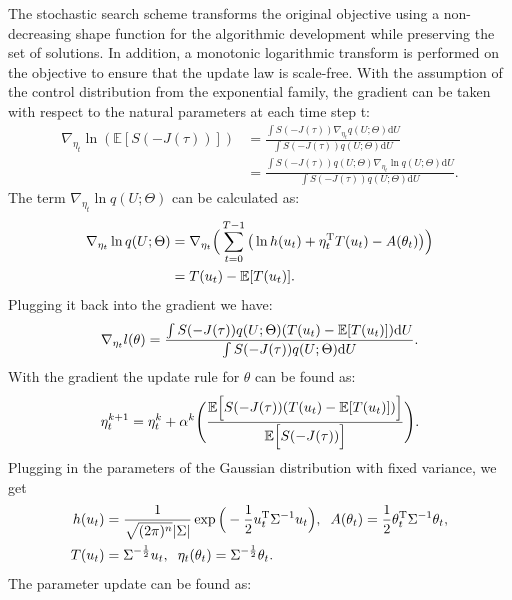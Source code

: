 \documentclass[twoside,11pt]{article}
\begin{document}
The stochastic search scheme transforms the original objective using a non-decreasing shape function for the algorithmic development while preserving the set of solutions. In addition, a monotonic logarithmic transform is performed on the objective to ensure that the update law is scale-free. With the assumption of the control distribution from the exponential family, the gradient can be taken with respect to the natural parameters at each time step t:
\begin{equation}
\begin{split}
\nabla_{\eta_t}  \ln\left(\mathbb{E}\left[S\left(- J(\tau)\right)\right]\right) &= \frac{\int S(-J(\tau))\nabla_{\eta_t} q(U;\Theta)\mathrm{d}U}{\int S(-J(\tau))q(U;\Theta)\mathrm{d}U} \\
&= \frac{\int S(-J(\tau))q(U;\Theta) \nabla_{\eta_t} \ln q(U;\Theta)\mathrm{d}U}{\int S(-J(\tau))q(U;\Theta)\mathrm{d}U}.
\end{split}
\end{equation}
The term $\nabla_{\eta_t} \ln q(U;\Theta)$ can be calculated as:
\begin{equation}
\begin{split}
\nabla_{\eta_t} \ln q(U;\Theta) &= \nabla_{\eta_t} \Big(\sum_{t=0}^{T-1}\big(\ln h(u_t) + \eta_t^\mathrm{T}T(u_t)-A(\theta_t) \big)\Big) \\
&= T(u_t) - \mathbb{E}[T(u_t)].
\end{split}
\end{equation}
Plugging it back into the gradient we have:
\begin{equation}
\nabla_{\eta_t} l(\theta) = \frac{\int S(-J(\tau))q(U;\Theta) (T(u_t) - \mathbb{E}[T(u_t)]) \mathrm{d}U}{\int S(-J(\tau))q(U;\Theta)\mathrm{d}U}\label{eq:gradient}.
\end{equation}
With the gradient the update rule for $\theta$ can be found as:
\begin{equation} \label{eq: ss_update}
\eta_t^{k+1} 
= \eta_t^k + \alpha^k\Bigg(\frac{\mathbb{E}\Big[S(-J(\tau)) (T(u_t) - \mathbb{E}[T(u_t)]) \Big]}{\mathbb{E} \Big[S(-J(\tau))\Big]}\Bigg).
\end{equation}
Plugging in the parameters of the Gaussian distribution with fixed variance, we get
\begin{equation}
\begin{split}
h(u_t) &= \frac{1}{\sqrt{(2\pi)^n}|\Sigma|}\exp\Big(-\frac{1}{2}u_t^\mathrm{T}\Sigma^{-1}u_t\Big), \hspace{2mm} A(\theta_t) = \frac{1}{2} \theta_t^\mathrm{T}\Sigma^{-1}\theta_t, \\
T(u_t) &= \Sigma^{-\frac{1}{2}} u_t, \hspace{2mm} \eta_t(\theta_t) = \Sigma^{-\frac{1}{2}}\theta_t.
\end{split}
\end{equation}
The parameter update can be found as:
\end{document}

